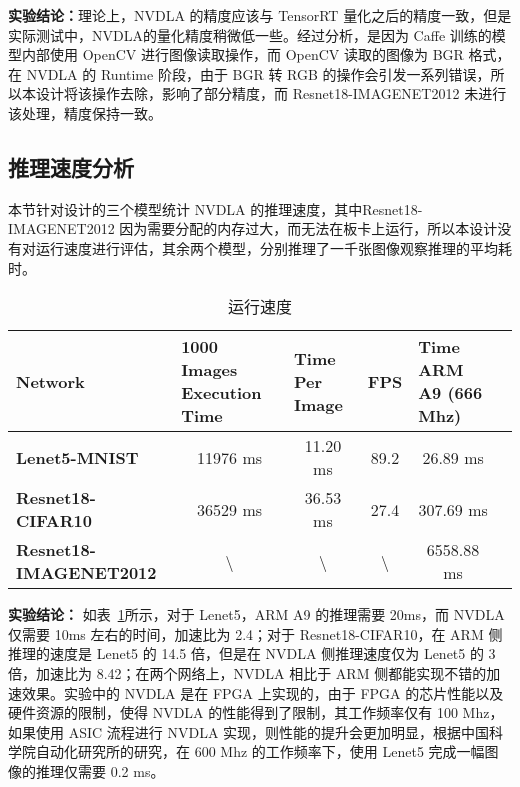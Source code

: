 \textbf{实验结论：}理论上，NVDLA 的精度应该与 TensorRT 量化之后的精度一致，但是实际测试中，NVDLA的量化精度稍微低一些。经过分析，是因为 Caffe 训练的模型内部使用 OpenCV 进行图像读取操作，而 OpenCV 读取的图像为 BGR 格式，在 NVDLA 的 Runtime 阶段，由于 BGR 转 RGB 的操作会引发一系列错误，所以本设计将该操作去除，影响了部分精度，而 Resnet18-IMAGENET2012 未进行该处理，精度保持一致。

\subsection{推理速度分析}

本节针对设计的三个模型统计 NVDLA 的推理速度，其中Resnet18-IMAGENET2012 因为需要分配的内存过大，而无法在板卡上运行，所以本设计没有对运行速度进行评估，其余两个模型，分别推理了一千张图像观察推理的平均耗时。

\begin{table}[!htbp]
    \caption{运行速度}
    \label{tab:Execution Time}
    \centering
    \footnotesize%
    \setlength{\tabcolsep}{4pt}%
    \renewcommand{\arraystretch}{1.2}%
    \begin{tabular}{lccccc}
        \toprule
        \textbf{Network}               & \multicolumn{1}{l}{\textbf{1000 Images Execution Time}} & \multicolumn{1}{l}{\textbf{Time Per Image}} & \textbf{FPS}     & \multicolumn{1}{l}{\textbf{Time ARM A9 (666 Mhz)}} \\
        \midrule
        \textbf{Lenet5-MNIST}          & 11976 ms                                               & 11.20 ms                                   & 89.2             & 26.89 ms                                           \\
        \textbf{Resnet18-CIFAR10}      & 36529 ms                                               & 36.53 ms                                   & 27.4             & 307.69 ms                                          \\
        \textbf{Resnet18-IMAGENET2012} & \textbackslash{}                                       & \textbackslash{}                           & \textbackslash{} & 6558.88 ms                                         \\
        \bottomrule                   
    \end{tabular}
\end{table}

\textbf{实验结论：} 如表~\ref{tab:Execution Time}所示，对于 Lenet5，ARM A9 的推理需要 20ms，而 NVDLA 仅需要 10ms 左右的时间，加速比为 2.4；对于 Resnet18-CIFAR10，在 ARM 侧推理的速度是 Lenet5 的 14.5 倍，但是在 NVDLA 侧推理速度仅为 Lenet5 的 3 倍，加速比为 8.42；在两个网络上，NVDLA 相比于 ARM 侧都能实现不错的加速效果。实验中的 NVDLA 是在 FPGA 上实现的，由于 FPGA 的芯片性能以及硬件资源的限制，使得 NVDLA 的性能得到了限制，其工作频率仅有 100 Mhz，如果使用 ASIC 流程进行 NVDLA 实现，则性能的提升会更加明显，根据中国科学院自动化研究所的研究，在 600 Mhz 的工作频率下，使用 Lenet5 完成一幅图像的推理仅需要 0.2 ms\cite{9040769}。 
